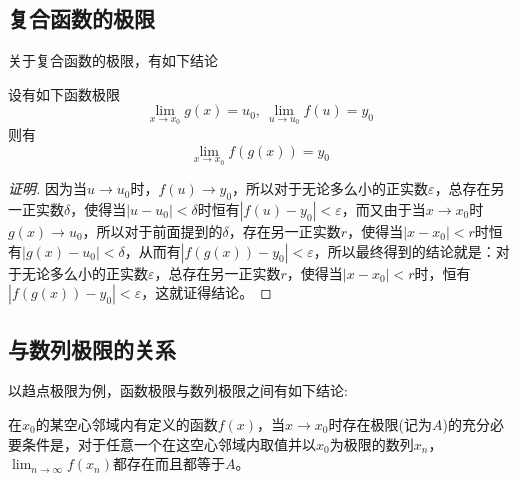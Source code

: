 \subsection{复合函数的极限}
\label{sec:limit-of-composite-function}


关于复合函数的极限，有如下结论
\begin{theorem}
  \label{theorem:limit-of-combine-function}
  设有如下函数极限
  \[ \lim_{x \to x_0}g(x) = u_0, \  \lim_{u \to u_0}f(u) = y_0 \]
  则有
  \[ \lim_{x \to x_0} f(g(x))=y_0 \]
\end{theorem}

\begin{proof}[证明]
  因为当$u \to u_0$时，$f(u) \to y_0$，所以对于无论多么小的正实数$\varepsilon$，总存在另一正实数$\delta$，使得当$|u-u_0|<\delta$时恒有$|f(u)-y_0|<\varepsilon$，而又由于当$x \to x_0$时$g(x) \to u_0$，所以对于前面提到的$\delta$，存在另一正实数$r$，使得当$|x-x_0|<r$时恒有$|g(x)-u_0|<\delta$，从而有$|f(g(x))-y_0|<\varepsilon$，所以最终得到的结论就是：对于无论多么小的正实数$\varepsilon$，总存在另一正实数$r$，使得当$|x-x_0|<r$时，恒有$|f(g(x))-y_0|<\varepsilon$，这就证得结论。
\end{proof}



\subsection{与数列极限的关系}
\label{sec:relation-between-limit-of-function-and-number-sequence}

以趋点极限为例，函数极限与数列极限之间有如下结论:
\begin{theorem}[函数极限与数列极限的关系]
  在$x_0$的某空心邻域内有定义的函数$f(x)$，当$x \to x_0$时存在极限(记为$A$)的充分必要条件是，对于任意一个在这空心邻域内取值并以$x_0$为极限的数列$x_n$，$\lim_{n \to \infty}f(x_n)$都存在而且都等于$A$。
\end{theorem}


